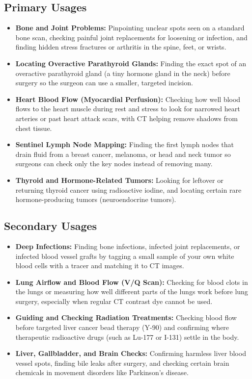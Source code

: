 \subsection{Primary Usages}
\begin{itemize}
    \item \textbf{Bone and Joint Problems:} Pinpointing unclear spots seen on a standard bone scan, checking painful joint replacements for loosening or infection, and finding hidden stress fractures or arthritis in the spine, feet, or wrists.
    \item \textbf{Locating Overactive Parathyroid Glands:} Finding the exact spot of an overactive parathyroid gland (a tiny hormone gland in the neck) before surgery so the surgeon can use a smaller, targeted incision.
    \item \textbf{Heart Blood Flow (Myocardial Perfusion):} Checking how well blood flows to the heart muscle during rest and stress to look for narrowed heart arteries or past heart attack scars, with CT helping remove shadows from chest tissue.
    \item \textbf{Sentinel Lymph Node Mapping:} Finding the first lymph nodes that drain fluid from a breast cancer, melanoma, or head and neck tumor so surgeons can check only the key nodes instead of removing many.
    \item \textbf{Thyroid and Hormone-Related Tumors:} Looking for leftover or returning thyroid cancer using radioactive iodine, and locating certain rare hormone-producing tumors (neuroendocrine tumors).
\end{itemize}

\subsection{Secondary Usages}
\begin{itemize}
    \item \textbf{Deep Infections:} Finding bone infections, infected joint replacements, or infected blood vessel grafts by tagging a small sample of your own white blood cells with a tracer and matching it to CT images.
    \item \textbf{Lung Airflow and Blood Flow (V/Q Scan):} Checking for blood clots in the lungs or measuring how well different parts of the lungs work before lung surgery, especially when regular CT contrast dye cannot be used.
    \item \textbf{Guiding and Checking Radiation Treatments:} Checking blood flow before targeted liver cancer bead therapy (Y-90) and confirming where therapeutic radioactive drugs (such as Lu-177 or I-131) settle in the body.
    \item \textbf{Liver, Gallbladder, and Brain Checks:} Confirming harmless liver blood vessel spots, finding bile leaks after surgery, and checking certain brain chemicals in movement disorders like Parkinson's disease.
\end{itemize}

